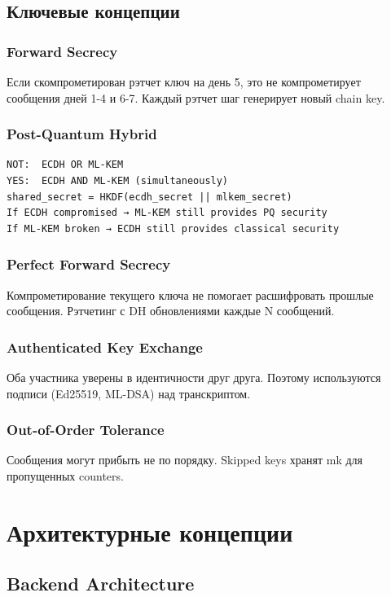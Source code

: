 \documentclass[11pt,a4paper,oneside]{book}
\begin{document}
\vspace{-0.3cm}\section{Ключевые концепции}
\vspace{-0.2cm}\subsection{Forward Secrecy}
Если скомпрометирован рэтчет ключ на день 5, это не компрометирует сообщения дней 1-4 и 6-7. Каждый рэтчет шаг генерирует новый chain key.
\vspace{-0.2cm}\subsection{Post-Quantum Hybrid}
\begin{verbatim}
NOT:  ECDH OR ML-KEM
YES:  ECDH AND ML-KEM (simultaneously)
shared_secret = HKDF(ecdh_secret || mlkem_secret)
If ECDH compromised → ML-KEM still provides PQ security
If ML-KEM broken → ECDH still provides classical security
\end{verbatim}
\vspace{-0.2cm}\subsection{Perfect Forward Secrecy}
Компрометирование текущего ключа не помогает расшифровать прошлые сообщения. Рэтчетинг с DH обновлениями каждые N сообщений.
\vspace{-0.2cm}\subsection{Authenticated Key Exchange}
Оба участника уверены в идентичности друг друга. Поэтому используются подписи (Ed25519, ML-DSA) над транскриптом.
\vspace{-0.2cm}\subsection{Out-of-Order Tolerance}
Сообщения могут прибыть не по порядку. Skipped keys хранят mk для пропущенных counters.
\vspace{-0.5cm}\chapter{Архитектурные концепции}
\vspace{-0.3cm}\section{Backend Architecture}
\end{document}
